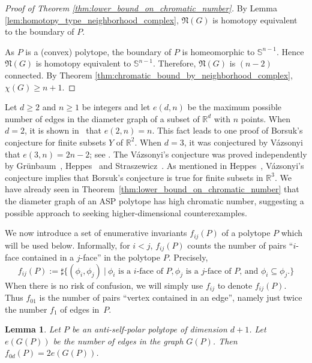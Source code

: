 \documentclass[12pt]{amsart}
\theoremstyle{plain}
\newtheorem{lemma}[theorem]{Lemma}
\newcommand{\R}{\mathbb{R}}
\newcommand{\Sp}{\mathbb{S}}
\numberwithin{equation}{section}
\begin{document}
\begin{proof}[Proof of Theorem \ref{thm:lower_bound_on_chromatic_number}]
	By Lemma \ref{lem:homotopy_type_neighborhood_complex}, $\mathfrak{N}(G)$ is homotopy equivalent to the boundary of $P$.

        As $P$ is a (convex) polytope, the boundary of $P$ is
        homeomorphic to $\Sp^{n-1}$.  Hence $\mathfrak{N}(G)$ is
        homotopy equivalent to $\Sp^{n-1}$.  Therefore,
        $\mathfrak{N}(G)$ is $(n-2)$ connected.  By Theorem
        \ref{thm:chromatic_bound_by_neighborhood_complex},
        $\chi(G)\geq n+1$.
\end{proof}

\label{heppes}
Let $d\geq 2$ and $n\geq1$ be integers and let $e(d, n)$ be the
maximum possible number of edges in the diameter graph of a subset of
$\R^d$ with $n$ points.  When $d=2$, it is shown
in~\cite{hopf1934aufgabe} that $e(2, n) = n$.  This fact leads to one
proof of Borsuk’s conjecture for finite subsets $Y$ of $\R^2$.  When
$d=3$, it was conjectured by V\'{a}zsonyi that $e(3, n)=2n-2$; see
\cite{erdos1946sets}.  The V\'{a}zsonyi's conjecture was proved
independently by Gr\"{u}nbaum~\cite{grunbaum1956proof},
Heppes~\cite{heppes1956beweis} and
Straszewicz~\cite{straszewicz1957probleme}.  As mentioned in
Heppes~\cite{heppes1956beweis}, V\'{a}zsonyi's conjecture implies that
Borsuk’s conjecture is true for finite subsets in $\R^3$.  We have
already seen in Theorem~\ref{thm:lower_bound_on_chromatic_number} that
the diameter graph of an ASP polytope has high chromatic number,
suggesting a possible approach to seeking higher-dimensional
counterexamples.



We now introduce a set of enumerative invariants $f_{ij}(P)$ of a polytope $P$ which will be used below.  Informally, for $i< j$, $f_{ij}(P)$ counts the number of pairs ``$i$-face contained in a $j$-face'' in the polytope $P$.
Precisely,
\[
f_{ij}(P) := \sharp \{(\phi_i, \phi_j)~|~ \phi_i \text{ is a $i$-face of $P$}, \phi_j \text{ is a $j$-face of $P$}\text{, and $\phi_i\subseteq \phi_j.$}\}
\]
When there is no risk of confusion, we will simply use $f_{ij}$ to denote $f_{ij}(P)$.
Thus $f_{01}$ is the
number of pairs ``vertex contained in an edge'', namely just twice the
number $f_1 $ of edges in~$P$.

\begin{lemma}\label{lemma:f_0d_and_diameter_graph}
Let $P$ be an anti-self-polar polytope of dimension $d+1$.
Let $e(G(P))$ be the number of edges in the graph $G(P)$.
Then $f_{0d}(P) = 2e(G(P))$.
\end{lemma}
\end{document}

